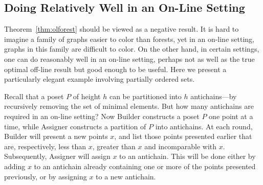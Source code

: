 \subsection{Doing Relatively Well in an On-Line Setting}

Theorem~\ref{thm:olforest} should be viewed as a negative
result.  It is hard to imagine a family of graphs easier to color
than forests, yet in an on-line setting, graphs in this family are 
difficult to color.  On the other hand, in certain settings, one can 
do reasonably well in an on-line setting, perhaps not as well as 
the true optimal off-line result but good enough
to be useful.  Here we present a particularly elegant example
involving partially ordered sets.

Recall that a poset $P$ of height $h$ can be partitioned into $h$
antichains---by recursively removing the set of minimal elements.
But how many antichains are required in an on-line setting?
Now Builder constructs a poset $P$ one point at a time,
while Assigner constructs a partition of $P$ into antichains.
At each round, Builder will present a new points $x$, and list
those points presented earlier that are, respectively, less than $x$,
greater than $x$ and incomparable with $x$.  Subsequently,
Assigner will assign $x$ to an antichain.  This will be done
either by adding $x$ to an antichain already containing one
or more of the points presented previously, or by assigning $x$
to a new antichain.

